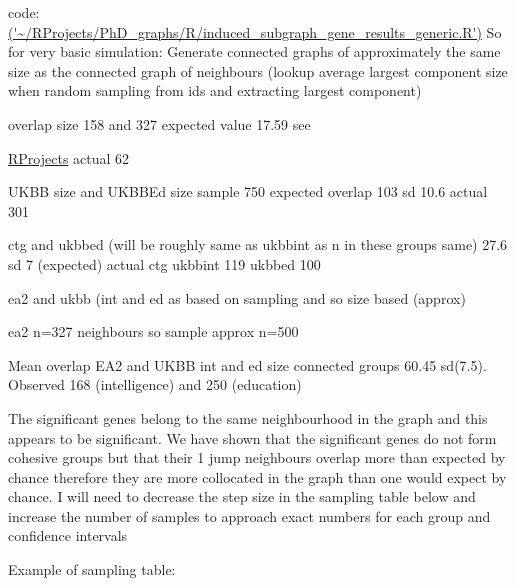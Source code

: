  code: \url{('~/RProjects/PhD_graphs/R/induced_subgraph_gene_results_generic.R')}
 So for very basic simulation:
 Generate connected graphs of approximately the same size as the connected graph of neighbours (lookup average largest component size when random sampling from ids and extracting largest component)
 
 overlap size 158 and 327 expected value 17.59 see
 

\url{RProjects}
actual  62
 
 UKBB size and UKBBEd size sample 750 expected overlap 103 sd 10.6 actual 301
 
 ctg and ukbbed (will be roughly same as ukbbint as n in these groups same)
 27.6 sd 7 (expected) actual ctg ukbbint 119 ukbbed 100
 
 ea2 and ukbb (int and ed as based on sampling and so size based (approx)
 
 ea2 n=327 neighbours so sample approx n=500
 
 Mean overlap EA2 and UKBB int and ed size connected groups 60.45 sd(7.5). Observed 168 (intelligence) and 250 (education)
 
 The significant genes belong to the same neighbourhood in the graph and this appears to be significant. We have shown that the significant genes do not form cohesive groups but that their 1 jump neighbours overlap more than expected by chance therefore they are more collocated in the graph than one would expect by chance.  I will need to decrease the step size in the sampling table below and increase the number of samples to approach exact numbers for each group and confidence intervals 
 
 
 Example of sampling table:
 
